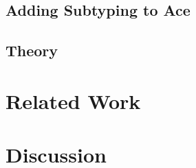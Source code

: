 \documentclass[10pt,preprint]{sigplanconf}
\theoremstyle{definition}
\begin{document}
\subsection{Adding Subtyping to Ace}
\subsection{Theory}

\section{Related Work}

\section{Discussion}






\end{document}
